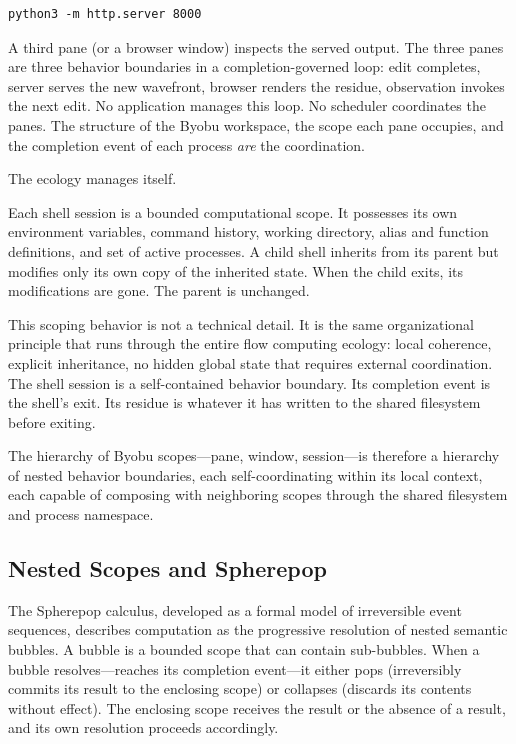 \documentclass[12pt, a4paper]{article}
\begin{document}
\begin{lstlisting}
python3 -m http.server 8000
\end{lstlisting}

A third pane (or a browser window) inspects the served output.
The three panes are three behavior boundaries in a
completion-governed loop: edit completes, server serves the
new wavefront, browser renders the residue, observation
invokes the next edit. No application manages this loop.
No scheduler coordinates the panes. The structure of the
Byobu workspace, the scope each pane occupies, and the
completion event of each process \emph{are} the coordination.

The ecology manages itself.

Each shell session is a bounded computational scope. It
possesses its own environment variables, command history,
working directory, alias and function definitions, and set
of active processes. A child shell inherits from its parent
but modifies only its own copy of the inherited state. When
the child exits, its modifications are gone. The parent is
unchanged.

This scoping behavior is not a technical detail. It is the
same organizational principle that runs through the entire
flow computing ecology: local coherence, explicit inheritance,
no hidden global state that requires external coordination.
The shell session is a self-contained behavior boundary. Its
completion event is the shell's exit. Its residue is whatever
it has written to the shared filesystem before exiting.

The hierarchy of Byobu scopes---pane, window, session---is
therefore a hierarchy of nested behavior boundaries, each
self-coordinating within its local context, each capable of
composing with neighboring scopes through the shared filesystem
and process namespace.

\subsection{Nested Scopes and Spherepop}

The Spherepop calculus, developed as a formal model of
irreversible event sequences, describes computation as the
progressive resolution of nested semantic bubbles. A bubble
is a bounded scope that can contain sub-bubbles. When a
bubble resolves---reaches its completion event---it either
pops (irreversibly commits its result to the enclosing scope)
or collapses (discards its contents without effect). The
enclosing scope receives the result or the absence of a result,
and its own resolution proceeds accordingly.
\end{document}
